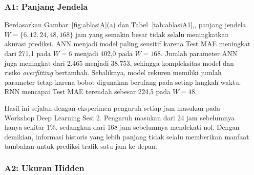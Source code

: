 \documentclass[conference,a4paper]{IEEEtran}
\begin{document}
\begin{table}[H]
\centering
\caption{Test MAE pada variasi panjang jendela di Duomo (rata-rata $\pm$ simpangan baku, tiga seed)}
\label{tab:ablasiA1}
\scriptsize
{}
\end{table}

\subsubsection{A1: Panjang Jendela}

Berdasarkan Gambar~\ref{fig:ablasiA}(a) dan Tabel~\ref{tab:ablasiA1},, panjang jendela $W=\{6,12,24,48,168\}$ jam yang semakin besar tidak selalu meningkatkan akurasi prediksi. ANN menjadi model paling sensitif karena Test MAE meningkat dari 271,1 pada $W=6$ menjadi 402,0 pada $W=168$. Jumlah parameter ANN juga meningkat dari 2.465 menjadi 38.753, sehingga kompleksitas model dan risiko \textit{overfitting} bertambah. Sebaliknya, model rekuren memiliki jumlah parameter tetap karena bobot digunakan berulang pada setiap langkah waktu. RNN mencapai Test MAE terendah sebesar 224,5 pada $W=48$.

Hasil ini sejalan dengan eksperimen pengaruh setiap jam masukan pada Workshop Deep Learning Sesi 2. Pengaruh masukan dari 24 jam sebelumnya hanya sekitar 1\%, sedangkan dari 168 jam sebelumnya mendekati nol. Dengan demikian, informasi historis yang lebih panjang tidak selalu memberikan manfaat tambahan untuk prediksi trafik satu jam ke depan.

\subsubsection{A2: Ukuran Hidden}
\end{document}

